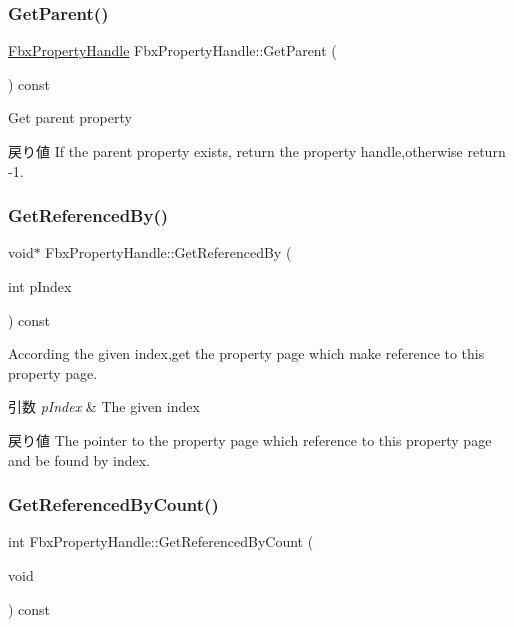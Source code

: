 \subsubsection{\texorpdfstring{Get\+Parent()}{GetParent()}}
{\footnotesize\ttfamily \hyperlink{class_fbx_property_handle}{Fbx\+Property\+Handle} Fbx\+Property\+Handle\+::\+Get\+Parent (\begin{DoxyParamCaption}{ }\end{DoxyParamCaption}) const}

Get parent property \begin{DoxyReturn}{戻り値}
If the parent property exists, return the property handle,otherwise return -\/1. 
\end{DoxyReturn}
\mbox{\label{class_fbx_property_handle_a94151c3aa9e0b6f1881bbec6ca389d0a}} 
\subsubsection{\texorpdfstring{Get\+Referenced\+By()}{GetReferencedBy()}}
{\footnotesize\ttfamily void$\ast$ Fbx\+Property\+Handle\+::\+Get\+Referenced\+By (\begin{DoxyParamCaption}\item[{int}]{p\+Index }\end{DoxyParamCaption}) const}

According the given index,get the property page which make reference to this property page. 
\begin{DoxyParams}{引数}
{\em p\+Index} & The given index \\
\hline
\end{DoxyParams}
\begin{DoxyReturn}{戻り値}
The pointer to the property page which reference to this property page and be found by index. 
\end{DoxyReturn}
\mbox{\label{class_fbx_property_handle_ac5fb2c38abc682f2151960ed4286f3ca}} 
\subsubsection{\texorpdfstring{Get\+Referenced\+By\+Count()}{GetReferencedByCount()}}
{\footnotesize\ttfamily int Fbx\+Property\+Handle\+::\+Get\+Referenced\+By\+Count (\begin{DoxyParamCaption}\item[{void}]{ }\end{DoxyParamCaption}) const}

